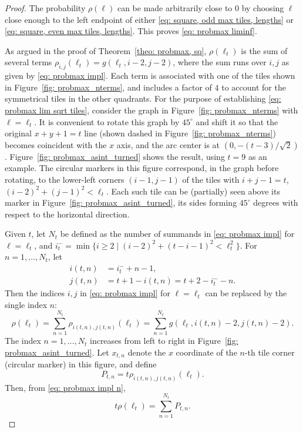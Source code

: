\documentclass[12pt, a4paper]{article}
\newcommand{\st}{\mid}%
\newcommand{\probmax}{\rho} %
\newcommand{\len}{\ell} %
\newcommand{\tiles}{t} %
\begin{document}
\begin{proof}
The probability $\probmax(\len)$ can be made arbitrarily close to $0$ by choosing $\len$ close enough to the left endpoint of either \eqref{eq: square, odd max tiles, lengths} or \eqref{eq: square, even max tiles, lengths}. This proves \eqref{eq: probmax liminf}.

As argued in the proof of Theorem~\ref{theo: probmax, sq}, $\probmax(\len_\tiles)$ is the sum of several terms $\probmax_{i,j}(\len_\tiles) = g(\len_\tiles, i-2, j-2)$, where the sum runs over $i,j$ as given by \eqref{eq: probmax impl}. Each term is associated with one of the tiles shown in Figure~\ref{fig: probmax_nterms}, and includes a factor of $4$ to account for the symmetrical tiles in the other quadrants. For the purpose of establishing \eqref{eq: probmax lim sqrt tiles}, consider the graph in Figure~\ref{fig: probmax_nterms} with $\len= \len_\tiles$. It is convenient to rotate this graph by $45^\circ$ and shift it so that the original $x+y+1 = \tiles$ line (shown dashed in Figure~\ref{fig: probmax_nterms}) becomes coincident with the $x$ axis, and the arc center is at $(0,-(\tiles-3)/\sqrt{2})$. Figure~\ref{fig: probmax_asint_turned} shows the result, using $\tiles=9$ as an example. The circular markers in this figure correspond, in the graph before rotating, to the lower-left corners $(i-1,j-1)$ of the tiles with $i+j-1=\tiles$, $(i-2)^2+(j-1)^2<\len_\tiles$. Each such tile can be (partially) seen above its marker in Figure~\ref{fig: probmax_asint_turned}, its sides forming $45^\circ$ degrees with respect to the horizontal direction.

Given $\tiles$, let $N_\tiles$ be defined as the number of summands in \eqref{eq: probmax impl} for $\len=\len_\tiles$, and $i_\tiles^- = \min\{i \geq 2 \st (i-2)^2 + (\tiles-i-1)^2 < \len_\tiles^2\}$. For $n=1,\ldots,N_\tiles$, let
\begin{align}
\label{eq: i equiv n}
i(\tiles,n) &= i_\tiles^- + n -1, \\
\label{eq: j equiv n}
j(\tiles,n) &= \tiles+1-i(\tiles,n) = \tiles + 2 - i_\tiles^- - n.
\end{align}
Then the indices $i,j$ in \eqref{eq: probmax impl} for $\len=\len_\tiles$ can be replaced by the single index $n$:
\begin{equation}
\label{eq: probmax impl n}
\probmax(\len_\tiles) = \sum_{n=1}^{N_\tiles} \probmax_{i(\tiles,n), j(\tiles,n)}(\len_\tiles) = \sum_{n=1}^{N_\tiles} g\left(\len_\tiles, i(\tiles,n)-2, j(\tiles,n)-2 \right).
\end{equation}
The index $n = 1,\ldots,N_\tiles$  increases from left to right in Figure~\ref{fig: probmax_asint_turned}. Let $x_{\tiles, n}$ denote the $x$ coordinate of the $n$-th tile corner (circular marker) in this figure, and define
\begin{equation}
P_{\tiles,n} = \tiles \probmax_{i(\tiles,n),j(\tiles,n)}(\len_\tiles).
\end{equation}
Then, from \eqref{eq: probmax impl n},
\begin{equation}
\label{eq: sum p t n}
\tiles \probmax(\len_\tiles) = \sum_{n=1}^{N_\tiles} P_{\tiles,n}.
\end{equation}


\end{proof}
\end{document}

